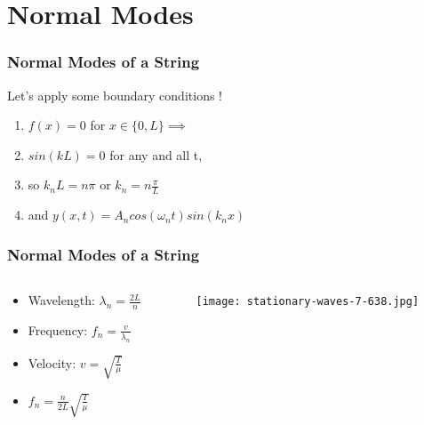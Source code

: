 \documentclass[pdf, handout, hideothersubsections]{beamer}
\begin{document}
\section{Normal Modes}
\begin{frame}
\frametitle{Normal Modes of a String}
\pause
Let's apply some boundary conditions ! \\
\pause
\begin{enumerate}
\item $f(x) = 0$ for $x \in \{0, L\} \implies$ \\
\pause
\item $sin(k L) = 0$ for any and all t,\\
\pause
\item so $k_n L = n \pi$ or $k_n = n \frac{\pi}{L}$ \\
\pause
\item and $y(x, t) = A_n cos(\omega_n t) sin(k_n x)$ \\
\end{enumerate}

\end{frame}

\begin{frame}
\frametitle{Normal Modes of a String}
\begin{columns}
\begin{column}{0.5\textwidth}

\begin{itemize}
\item Wavelength:  $\lambda_n = \frac{2 L}{n}$

\item Frequency:  $f_n = \frac{v}{\lambda_n}$

\item Velocity:  $v = \sqrt{\frac{T}{\mu}}$

\item $f_n = \frac{n}{2 L} \sqrt{\frac{T}{\mu}}$
\end{itemize}

\end{column}

\begin{column}{0.5\textwidth}

\centering
\texttt{[image: stationary-waves-7-638.jpg]}

\end{column}
\end{columns}
\end{frame}
\end{document}
